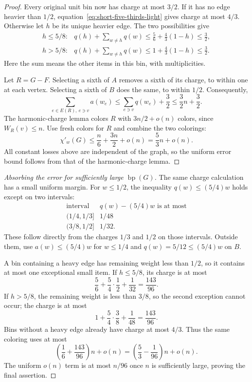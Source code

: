 \documentclass[11pt]{article}
\theoremstyle{definition}\newtheorem{algorithm}{Algorithm}[section]
\numberwithin{equation}{section}
\theoremstyle{remark}\newtheorem*{remark}{Remark}
\newcommand{\bp}{\operatorname{bp}}
\begin{document}
\begin{proof}
Every original unit bin now has charge at most $3/2$. If it has no
edge heavier than $1/2$, equation~\eqref{eq:short-five-thirds-light}
gives charge at most $4/3$. Otherwise let $h$ be its unique heavier
edge. The two possibilities give
\[
 \begin{array}{ll}
 h\le5/8:&\displaystyle
    q(h)+\sum_{w\ne h}q(w)
    \le\frac56+\frac43(1-h)\le\frac32,\\[5pt]
 h>5/8:&\displaystyle
    q(h)+\sum_{w\ne h}q(w)
    \le1+\frac43(1-h)\le\frac32.
 \end{array}
\]
Here the sum means the other items in this bin, with multiplicities.

Let $R=G-F$. Selecting a sixth of $A$ removes a sixth of its charge,
to within one at each vertex. Selecting a sixth of $B$ does the same,
to within $1/2$. Consequently,
\[
 \sum_{e\in E(R),\ e\ni v}a(w_e)
 \le\sum_{e\ni v}q(w_e)+\frac32
 \le\frac32n+\frac32.
\]
The harmonic-charge lemma colors $R$ with $3n/2+o(n)$ colors, since
$W_R(v)\le n$. Use fresh colors for $R$ and combine the two colorings:
\[
 \chi'_w(G)\le\frac n6+\frac{3n}{2}+o(n)
             =\frac53n+o(n).
\]
All constant losses above are independent of the graph, so the uniform
error bound follows from that of the harmonic-charge lemma.
\end{proof}

\begin{proof}[Absorbing the error for sufficiently large $\bp(G)$]
The same charge calculation has a small uniform margin. For $w\le1/2$,
the inequality $q(w)\le(5/4)w$ holds except on two intervals:
\[
 \begin{array}{c|c}
 \text{interval}&q(w)-(5/4)w\text{ is at most}\\\hline
 (1/4,1/3]&1/48\\
 (3/8,1/2]&1/32.
 \end{array}
\]
These follow directly from the charges $1/3$ and $1/2$ on those
intervals. Outside them, use $a(w)\le(5/4)w$ for $w\le1/4$ and
$q(w)=5/12\le(5/4)w$ on $B$.

A bin containing a heavy edge has remaining weight less than $1/2$,
so it contains at most one exceptional small item. If $h\le5/8$,
its charge is at most
\[
 \frac56+\frac54\cdot\frac12+\frac1{32}=\frac{143}{96}.
\]
If $h>5/8$, the remaining weight is less than $3/8$, so the second
exception cannot occur; the charge is at most
\[
 1+\frac54\cdot\frac38+\frac1{48}=\frac{143}{96}.
\]
Bins without a heavy edge already have charge at most $4/3$.
Thus the same coloring uses at most
\[
 \left(\frac16+\frac{143}{96}\right)n+o(n)
 =\left(\frac53-\frac1{96}\right)n+o(n).
\]
The uniform $o(n)$ term is at most $n/96$ once $n$ is sufficiently
large, proving the final assertion.
\end{proof}
\end{document}
